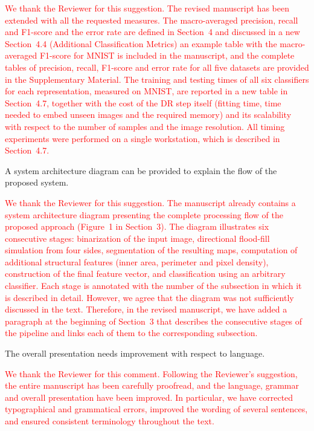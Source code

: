 \documentclass{ar2rc}
\begin{document}
\AR
\textcolor{red}{We thank the Reviewer for this suggestion. The revised manuscript has been extended with all the requested measures. The macro-averaged precision, recall and F1-score and the error rate are defined in Section~4 and discussed in a new Section~4.4 (Additional Classification Metrics) an example table with the macro-averaged F1-score for MNIST is included in the manuscript, and the complete tables of precision, recall, F1-score and error rate for all five datasets are provided in the Supplementary Material. The training and testing times of all six classifiers for each representation, measured on MNIST, are reported in a new table in Section~4.7, together with the cost of the DR step itself (fitting time, time needed to embed unseen images and the required memory) and its scalability with respect to the number of samples and the image resolution. All timing experiments were performed on a single workstation, which is described in Section~4.7.}


\RC %
A system architecture diagram can be provided to explain the flow of the proposed system.

\AR
\textcolor{red}{We thank the Reviewer for this suggestion. The manuscript already contains a system architecture diagram presenting the complete processing flow of the proposed approach (Figure~1 in Section~3). The diagram illustrates six consecutive stages: binarization of the input image, directional flood-fill simulation from four sides, segmentation of the resulting maps, computation of additional structural features (inner area, perimeter and pixel density), construction of the final feature vector, and classification using an arbitrary classifier. Each stage is annotated with the number of the subsection in which it is described in detail. However, we agree that the diagram was not sufficiently discussed in the text. Therefore, in the revised manuscript, we have added a paragraph at the beginning of Section~3 that describes the consecutive stages of the pipeline and links each of them to the corresponding subsection.}

\RC %
 The overall presentation needs improvement with respect to language.

\AR
\textcolor{red}{We thank the Reviewer for this comment. Following the Reviewer's suggestion, the entire manuscript has been carefully proofread, and the language, grammar and overall presentation have been improved. In particular, we have corrected typographical and grammatical errors, improved the wording of several sentences, and ensured consistent terminology throughout the text.}
\end{document}
